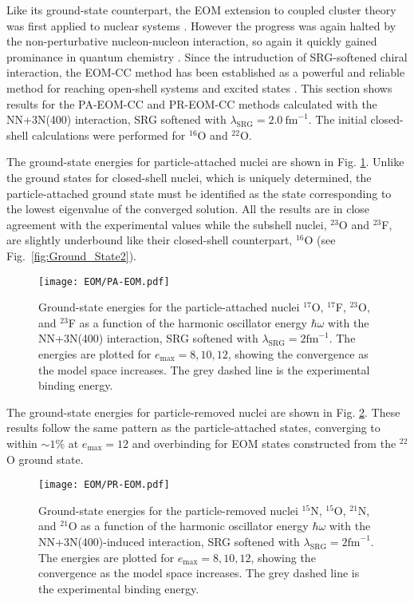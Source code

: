 \documentclass[thesis.tex]{subfiles}
\begin{document}
Like its ground-state counterpart, the EOM extension to coupled cluster theory was first applied to nuclear systems \cite{EMRICH1981379,EMRICH1981397,EMRICH1981439}.  However the progress was again halted by the non-perturbative nucleon-nucleon interaction, so again it quickly gained prominance in quantum chemistry \cite{STANTON1993,SHAVITT2009}.  Since the intruduction of SRG-softened chiral interaction, the EOM-CC method has been established as a powerful and reliable method for reaching open-shell systems and excited states \cite{WLOCH2005212501,GOUR2006024310,JANSEN2013,HAGEN2012,EKSTROM2015}.  This section shows results for the PA-EOM-CC and PR-EOM-CC methods calculated with the NN+3N(400) interaction, SRG softened with $\lambda_{\mathrm{SRG}}=2.0\ \mathrm{fm}^{-1}$.  The initial closed-shell calculations were performed for $^{16}$O and $^{22}$O.

The ground-state energies for particle-attached nuclei are shown in Fig. \ref{fig:PA-Nuclei}.  Unlike the ground states for closed-shell nuclei, which is uniquely determined, the particle-attached ground state must be identified as the state corresponding to the lowest eigenvalue of the converged solution.  All the results are in close agreement with the experimental values while the subshell nuclei, $^{23}$O and $^{23}$F, are slightly underbound like their closed-shell counterpart, $^{16}$O (see Fig.\ \ref{fig:Ground_State2}).
\begin{figure}[h]
  \centering
  \texttt{[image: EOM/PA-EOM.pdf]}
  \caption{Ground-state energies for the particle-attached nuclei $^{17}$O, $^{17}$F, $^{23}$O, and $^{23}$F as a function of the harmonic oscillator energy $\hbar\omega$ with the NN+3N(400) interaction, SRG softened with $\lambda_{\mathrm{SRG}}=2\mathrm{fm}^{-1}$.  The energies are plotted for $e_\mathrm{max}=8,10,12$, showing the convergence as the model space increases.  The grey dashed line is the experimental binding energy.}
  \label{fig:PA-Nuclei}
\end{figure}

The ground-state energies for particle-removed nuclei are shown in Fig. \ref{fig:PR-Nuclei}.  These results follow the same pattern as the particle-attached states, converging to within $\sim 1\%$ at $e_{\mathrm{max}}=12$ and overbinding for EOM states constructed from the $^{22}$O ground state.
\begin{figure}[h]
  \centering
  \texttt{[image: EOM/PR-EOM.pdf]}
  \caption{Ground-state energies for the particle-removed nuclei $^{15}$N, $^{15}$O, $^{21}$N, and $^{21}$O as a function of the harmonic oscillator energy $\hbar\omega$ with the NN+3N(400)-induced interaction, SRG softened with $\lambda_{\mathrm{SRG}}=2\mathrm{fm}^{-1}$.  The energies are plotted for $e_\mathrm{max}=8,10,12$, showing the convergence as the model space increases.  The grey dashed line is the experimental binding energy.}
  \label{fig:PR-Nuclei}
\end{figure}
\end{document}
